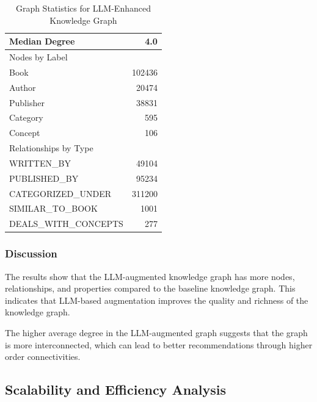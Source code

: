 \documentclass{article}
\begin{document}
\begin{table}[H]
\begin{minipage}{0.45\textwidth}
\begin{tabular}{|l|r|}
                  Median Degree               & 4.0            \\ \hline
                  Nodes by Label              &                \\
                  \quad Book                  & 102436         \\
                  \quad Author                & 20474          \\
                  \quad Publisher             & 38831          \\
                  \quad Category              & 595            \\
                  \quad Concept               & 106            \\ \hline
                  Relationships by Type       &                \\
                  \quad WRITTEN\_BY           & 49104          \\
                  \quad PUBLISHED\_BY         & 95234          \\
                  \quad CATEGORIZED\_UNDER    & 311200         \\
                  \quad SIMILAR\_TO\_BOOK     & 1001           \\
                  \quad DEALS\_WITH\_CONCEPTS & 277            \\ \hline
            \end{tabular}
            \caption{Graph Statistics for LLM-Enhanced Knowledge Graph}
            \label{tab:enhanced-stats}
      \end{minipage}
\end{table}

\subsubsection{Discussion}
The results show that the LLM-augmented knowledge graph has more nodes,
relationships, and properties compared to the baseline knowledge graph. This
indicates that LLM-based augmentation improves the quality and richness of the
knowledge graph.

The higher average degree in the LLM-augmented graph suggests that the graph is
more interconnected, which can lead to better recommendations through higher order connectivities.

\subsection{Scalability and Efficiency Analysis}
\end{document}
